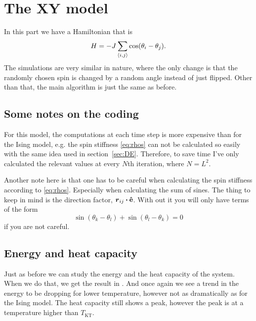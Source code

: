 \documentclass[11pt,letter, swedish, english
]{article}
\begin{document}



\section{The XY model}
\newcommand{\rhos}{\rho_{\text{s}}}
\newcommand{\TKT}{T_{\text{KT}}}

In this part we have a Hamiltonian that is
\begin{equation}
H = -J\sum_{\ev{i, j}} \cos(\theta_i - \theta_j).
\end{equation}
The simulations are very similar in nature, where the only change is
that the randomly chosen spin is changed by a random angle instead of
just flipped. Other than that, the main algorithm is just the same as
before. 

\subsection{Some notes on the coding}
For this model, the computations at each time step is more expensive
than for the Ising model, e.g. the spin stiffness
\eqref{eq:rhos} can not be calculated so easily with the same idea
used in section~\ref{sec:DE}. Therefore, to save time I've only
calculated the relevant values at every $N$th iteration, where
$N=L^2$. 

Another note here is that one has to be careful when calculating the
spin stiffness according to \eqref{eq:rhos}. Especially when
calculating the sum of sines. The thing to keep in mind is the
direction factor, $\vb*r_{ij}\vdot\vu{e}$. With out it you will only
have terms of the form
\begin{equation}
\sin(\theta_k - \theta_l) + \sin(\theta_l - \theta_k) =0
\end{equation}
if you are not careful. 

\subsection{Energy and heat capacity}
Just as before we can study the energy and the heat capacity of the
system. When we do that, we get the result in . And
once again we see a trend in the energy to be dropping for lower
temperature, however not as dramatically as for the Ising model. 
The heat capacity still shows a peak, however the peak is at a
temperature higher than $\TKT$. 
\end{document}
